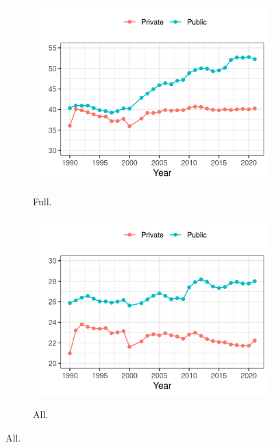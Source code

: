 \begin{figure}[h!]
\begin{subfigure}[b]{0.495\textwidth}
        \label{fig:assistant-fte-perprof}
    \end{subfigure}
    \begin{subfigure}[b]{0.495\textwidth}
        \centering
        \caption{Full.}
        \includegraphics[width=\textwidth]{figures/full-fte-perprof.png}
        \label{fig:full-fte-perprof}
    \end{subfigure}
    \begin{subfigure}[b]{0.495\textwidth}
        \centering
        \caption{All.}
        \includegraphics[width=\textwidth]{figures/all-fte-perprof.png}
        \label{fig:all-fte-perprof}
    \end{subfigure}
    \label{fig:fte-perprof}
\end{figure}

